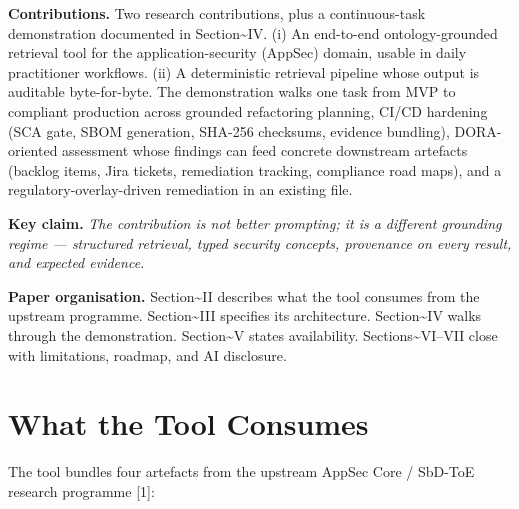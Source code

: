 \documentclass[conference]{IEEEtran}
\begin{document}
\textbf{Contributions.} Two research contributions, plus a
continuous-task demonstration documented in Section\textasciitilde IV.
(i) An end-to-end ontology-grounded retrieval tool for the
application-security (AppSec) domain, usable in daily practitioner
workflows. (ii) A deterministic retrieval pipeline whose output is
auditable byte-for-byte. The demonstration walks one task from MVP to
compliant production across grounded refactoring planning, CI/CD
hardening (SCA gate, SBOM generation, SHA-256 checksums, evidence
bundling), DORA-oriented assessment whose findings can feed concrete
downstream artefacts (backlog items, Jira tickets, remediation tracking,
compliance road maps), and a regulatory-overlay-driven remediation in an
existing file.

\textbf{Key claim.}
\emph{The contribution is not better prompting; it is a different grounding regime --- structured retrieval, typed security concepts, provenance on every result, and expected evidence.}

\textbf{Paper organisation.} Section\textasciitilde II describes what
the tool consumes from the upstream programme.
Section\textasciitilde III specifies its architecture.
Section\textasciitilde IV walks through the demonstration.
Section\textasciitilde V states availability.
Sections\textasciitilde VI--VII close with limitations, roadmap, and AI
disclosure.

\section{What the Tool Consumes}\label{what-the-tool-consumes}

The tool bundles four artefacts from the upstream AppSec Core / SbD-ToE
research programme {[}1{]}:
\end{document}
